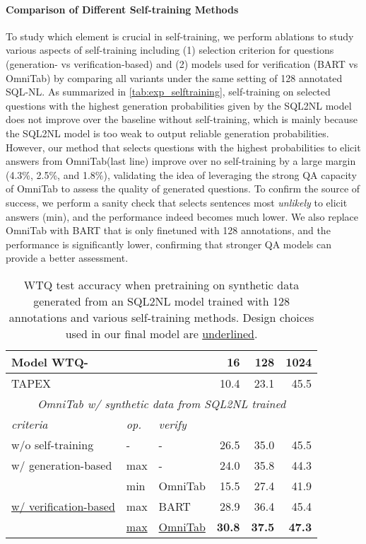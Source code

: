 \documentclass[11pt]{article}
\def\smallcol{\hskip 6pt}
\def\ours{OmniTab\xspace}
\begin{document}
\paragraph{Comparison of Different Self-training Methods}
To study which element is crucial in self-training, we perform ablations to study various aspects of self-training including (1) selection criterion for questions (generation- vs verification-based) and (2) models used for verification (BART vs \ours) by comparing all variants under the same setting of 128 annotated SQL-NL. 
As summarized in \autoref{tab:exp_selftraining}, self-training on selected questions with the highest generation probabilities given by the SQL2NL model does not improve over the baseline without self-training, which is mainly because the SQL2NL model is too weak to output reliable generation probabilities.
However, our method that selects questions with the highest probabilities to elicit answers from \ours (last line) improve over no self-training by a large margin (4.3\%, 2.5\%, and 1.8\%), validating the idea of leveraging the strong QA capacity of \ours to assess the quality of generated questions.
To confirm the source of success, we perform a sanity check that selects sentences most \emph{unlikely} to elicit answers (min), and the performance indeed becomes much lower.
We also replace \ours with BART that is only finetuned with 128 annotations, and the performance is significantly lower, confirming that stronger QA models can provide a better assessment.

\begin{table}
\small
\centering
\begin{tabular}{l@{\smallcol}l@{\smallcol}lr@{\smallcol}r@{\smallcol}r}
\toprule
\multicolumn{3}{l}{\textbf{Model} \hfill{\textbf{WTQ-}}} & \textbf{16} & \textbf{128} & \textbf{1024} \\
\midrule
\multicolumn{3}{l}{TAPEX \cite{tapex-2021-liu}} & 10.4 & 23.1 & 45.5 \\
\midrule
\multicolumn{6}{c}{\emph{\ours w/ synthetic data from SQL2NL trained}} \\
\emph{criteria} & \emph{op.} & \emph{verify}  \\
w/o self-training & - & - & 26.5 & 35.0 & 45.5 \\
w/ generation-based & max & - & 24.0 & 35.8 & 44.3 \\
\multirow{3}{*}{\underline{w/ verification-based}} & min & \ours & 15.5 & 27.4 & 41.9 \\
 & max & BART & 28.9 & 36.4 & 45.4 \\
 & \underline{max} & \underline{\ours} & \textbf{30.8} & \textbf{37.5} & \textbf{47.3} \\
\bottomrule
\end{tabular}
\caption{WTQ test accuracy when pretraining on synthetic data generated from an SQL2NL model trained with 128 annotations and various self-training methods. Design choices used in our final model are \underline{underlined}.}
\label{tab:exp_selftraining}
\end{table}
\end{document}
